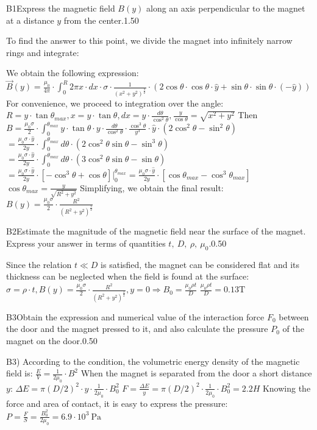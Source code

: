 \documentclass[11pt,a4paper]{article}
\begin{document}
\begin{solcard}{B1}{Express the magnetic field $B(y)$ along an axis perpendicular to the magnet at a distance $y$ from the center.}{1.50}

To find the answer to this point, we divide the magnet into infinitely narrow rings and integrate:


We obtain the following expression: $\vec B (y) = \frac {\mu_0} {4\pi} \cdot \int ^R_0 2\pi x \cdot dx \cdot \sigma \cdot \frac {1} {(x^2+y^2)^{\frac{3}{2}}} \cdot (2 \cos \theta \cdot \cos \theta \cdot \hat{y} + \sin \theta \cdot \sin \theta \cdot (-\hat{y}))$ For convenience, we proceed to integration over the angle: $R = y \cdot \tan \theta_{max}, x=y\cdot \tan \theta, dx=y\cdot \frac {d\theta}{\cos^2\theta}, \frac{y}{\cos\theta}=\sqrt{x^2+y^2}$ Then $B=\frac {\mu_0 \sigma}{2} \cdot \int ^{\theta_{max}}_0 y\cdot \tan \theta \cdot y \cdot \frac {d\theta} {\cos^2\theta} \cdot \frac{\cos^3 \theta}{y^3}\cdot \hat{y} \cdot (2\cos^2\theta-\sin^2\theta)$ $=\frac{\mu_0\sigma \cdot \hat{y}}{2y} \cdot \int^{\theta_{max}}_0 d\theta \cdot (2 \cos^2\theta \sin \theta - \sin^3 \theta)$ $=\frac{\mu_0\sigma \cdot \hat{y}}{2y} \cdot \int^{\theta_{max}}_0 d \theta \cdot (3\cos^2 \theta \sin \theta - \sin \theta)$ $=\frac{\mu_0\sigma\cdot \hat{y}}{2y} \cdot [-\cos^3\theta+\cos\theta]|^{ \theta_{max}}_0=\frac{\mu_0\sigma \cdot \hat{y}}{2y}\cdot[\cos \theta_{max}- \cos^3 \theta_{max}]$ $\cos \theta_{max} = \frac {y} {\sqrt{R^2+y^2}}$ Simplifying, we obtain the final result: $B(y)=\frac{\mu_0\sigma}{2}\cdot \frac{R^2}{(R^2+y^2)^{\frac{3}{2}}}$

\end{solcard}

\begin{solcard}{B2}{Estimate the magnitude of the magnetic field near the surface of the magnet. Express your answer in terms of quantities $t,~D,~\rho,~\mu_0$.}{0.50}

Since the relation $t \ll D$ is satisfied, the magnet can be considered flat and its thickness can be neglected when the field is found at the surface: $\sigma=\rho\cdot t, B(y)=\frac{ \mu_0\sigma}{2}\cdot \frac {R^2} {(R^2+y^2)^{\frac{3}{2}}}, y=0 \Rightarrow B_0 = \frac {\mu_0\rho t} {D}$ $\frac{\mu_0\rho t}{D}=0.13 \text{T}$

\end{solcard}

\begin{solcard}{B3}{Obtain the expression and numerical value of the interaction force $F_0$ between the door and the magnet pressed to it, and also calculate the pressure $P_0$ of the magnet on the door.}{0.50}

B3) According to the condition, the volumetric energy density of the magnetic field is: $\frac{E}{V}=\frac {1}{2\mu_0} \cdot B^2$ When the magnet is separated from the door a short distance $y$: $\Delta E = \pi (D/2)^2\cdot y\cdot \frac{1}{2\mu_0} \cdot B^2_0 $ $F=\frac {\Delta E}{y} = \pi (D/2)^2 \cdot \frac {1}{2\mu_0}\cdot B^2_0= 2.2 H$ Knowing the force and area of contact, it is easy to express the pressure: $P=\frac{F}{S}=\frac{B^2_0}{2\mu_0} =6.9\cdot 10^3~\text{Pa}$

\end{solcard}
\end{document}
